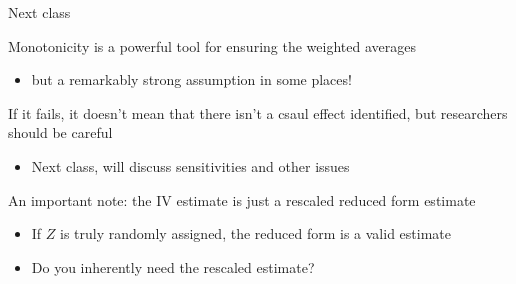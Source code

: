 \documentclass[notes,11pt, aspectratio=169]{beamer}
\newenvironment{wideitemize}{\itemize\addtolength{\itemsep}{10pt}}{\enditemize}
\begin{document}
\begin{frame}{Next class}
  \begin{wideitemize}
  \item   Monotonicity is a powerful tool for ensuring the weighted averages
    \begin{itemize}
    \item   but a remarkably strong assumption in some places!
    \end{itemize}
  \item If it fails, it doesn't mean that there isn't a csaul effect
    identified, but researchers should be careful
    \begin{itemize}
    \item Next class, will discuss sensitivities and other issues
    \end{itemize}
  \item An important note: the IV estimate is just a rescaled reduced
    form estimate
    \begin{itemize}
    \item If $Z$ is truly randomly assigned, the reduced form is a valid estimate
      \item Do you inherently need the rescaled estimate? 
    \end{itemize}
  \end{wideitemize}
\end{frame}
\end{document}
